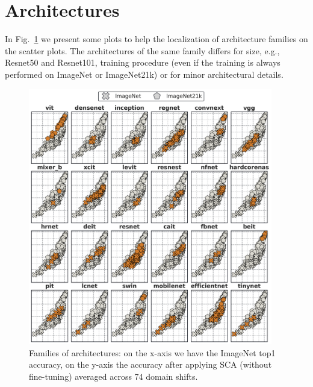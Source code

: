 \documentclass{article}
\begin{document}
\section{Architectures}
\label{models}
In Fig.~\ref{reg1} we present some plots to help the localization of architecture families on the scatter plots. The architectures of the same family differs for size, e.g., Resnet50 and Resnet101, training procedure (even if the training is always performed on ImageNet or ImageNet21k) or for minor architectural details.

\begin{figure}[h!]
\begin{center}
\includegraphics[width=0.95\textwidth]{images/families.png}
\end{center}
\caption{Families of architectures: on the x-axis we have the ImageNet top1 accuracy, on the y-axis the accuracy after applying SCA (without fine-tuning) averaged across 74 domain shifts.}
\label{reg1}
\end{figure}

\end{document}
